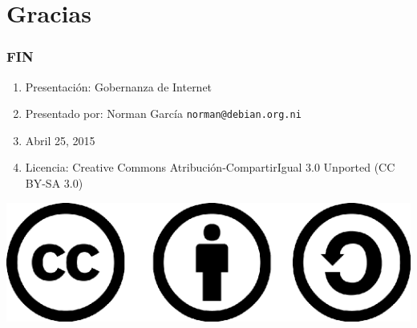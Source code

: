 \documentclass{beamer}
\begin{document}
\section{Gracias}
\begin{frame}
\frametitle{FIN}
	\begin{enumerate}
		\pause \item Presentaci\'on: Gobernanza de Internet
		\pause \item Presentado por: Norman Garc\'ia  \texttt{norman@debian.org.ni}
		\pause \item Abril 25, 2015
		\pause \item Licencia: Creative Commons Atribuci\'on-CompartirIgual 3.0 Unported (CC BY-SA 3.0)
	\end{enumerate}

	\begin{center}
  		 \includegraphics[scale=0.20]{../img/cclogo.png}
	\end{center}

\end{frame}
\end{document}
